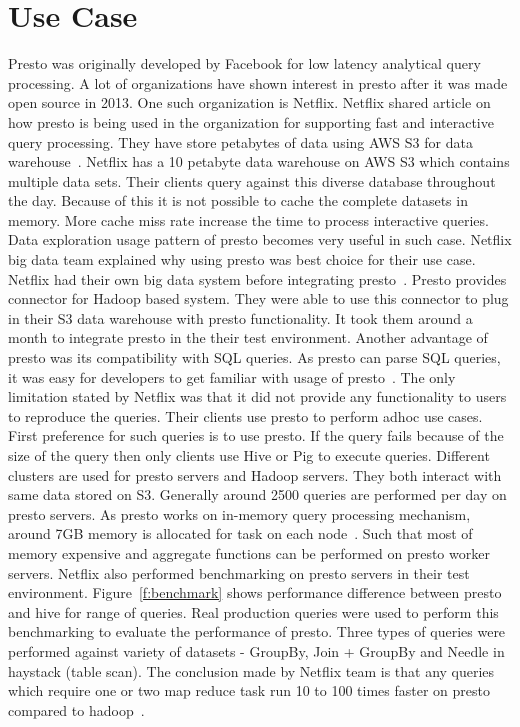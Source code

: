 \section{Use Case}
Presto was originally developed by Facebook for low latency analytical query
processing. A lot of organizations have shown interest in presto after it
was made open source in 2013. One such organization is Netflix. Netflix shared
article on how presto is being used in the organization for supporting fast and
interactive query processing. They have store petabytes of data using AWS S3 for
 data warehouse~\cite{hid-sp18-502-presto-usecase}.
Netflix has a 10 petabyte data warehouse on AWS S3 which contains multiple
data sets. Their clients query against this diverse database throughout the day.
 Because of this it is not possible to cache the complete datasets in memory.
More cache miss rate increase the time to process interactive queries. Data
exploration usage pattern of presto becomes very useful in such case. Netflix
big data team explained why using presto was best choice for their use case.
Netflix had their own big data system before integrating
presto~\cite{hid-sp18-502-presto-usecase}. Presto provides connector for Hadoop
based system. They were able to use this connector to plug in their S3 data
warehouse with presto functionality. It took them around a month to integrate
presto in the their test environment. Another advantage of presto was its
compatibility with SQL queries. As presto can parse SQL queries, it was easy for
 developers to get familiar with usage of
 presto~\cite{hid-sp18-502-presto-usecase}. The only limitation stated by
 Netflix was that it did not provide any functionality to users to reproduce the
  queries. Their clients use presto to perform adhoc use cases. First preference
 for such queries is to use presto. If the query fails because of the size of
 the query then only clients use Hive or Pig to execute queries. Different
 clusters are used for presto servers and Hadoop servers. They both interact
 with same data stored on S3. Generally around 2500 queries are performed per
 day on presto servers. As presto works on in-memory query processing mechanism,
 around 7GB memory is allocated for task on each
 node~\cite{hid-sp18-502-presto-usecase}. Such that most of memory expensive and
 aggregate functions can be performed on presto worker servers.
Netflix also performed benchmarking on presto servers in their test environment.
 Figure~\ref{f:benchmark} shows performance difference between presto and hive
 for range of queries. Real production queries were used to perform this
 benchmarking to evaluate the performance of presto. Three types of queries were
 performed against variety of datasets - GroupBy, Join + GroupBy and Needle in
 haystack (table scan). The conclusion made by Netflix team is that any queries
 which require one or two map reduce task run 10 to 100 times faster on presto
 compared to hadoop~\cite{hid-sp18-502-presto-usecase}.

